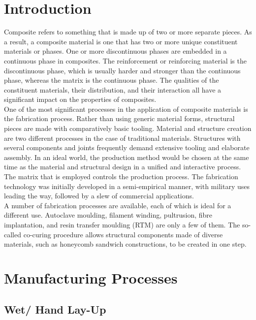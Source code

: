 \documentclass{article}
\begin{document}
\begin{multicols}{2}
\vspace{3mm}
\section{Introduction}

Composite refers to something that is made up of two or more separate pieces. As a result, a composite material is one that has two or more unique constituent materials or phases. One or more discontinuous phases are embedded in a continuous phase in composites. The reinforcement or reinforcing material is the discontinuous phase, which is usually harder and stronger than the continuous phase, whereas the matrix is the continuous phase. The qualities of the constituent materials, their distribution, and their interaction all have a significant impact on the properties of composites.\\

One of the most significant processes in the application of composite materials is the fabrication process. Rather than using generic material forms, structural pieces are made with comparatively basic tooling. Material and structure creation are two different processes in the case of traditional materials. Structures with several components and joints frequently demand extensive tooling and elaborate assembly. In an ideal world, the production method would be chosen at the same time as the material and structural design in a unified and interactive process. The matrix that is employed controls the production process. The fabrication technology was initially developed in a semi-empirical manner, with military uses leading the way, followed by a slew of commercial applications.\\

A number of fabrication processes are available, each of which is ideal for a different use. Autoclave moulding, filament winding, pultrusion, fibre implantation, and resin transfer moulding (RTM) are only a few of them. The so-called co-curing procedure allows structural components made of diverse materials, such as honeycomb sandwich constructions, to be created in one step.

\section{Manufacturing Processes}

\subsection{Wet/ Hand Lay-Up}


\end{multicols}
\end{document}
